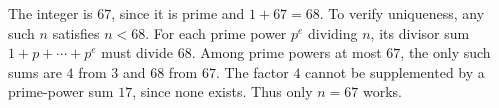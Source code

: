 The integer is $\boxed{67}$, since it is prime and $1+67=68$. To verify uniqueness, any such $n$ satisfies $n<68$. For each prime power $p^e$ dividing $n$, its divisor sum $1+p+\cdots+p^e$ must divide $68$. Among prime powers at most $67$, the only such sums are $4$ from $3$ and $68$ from $67$. The factor $4$ cannot be supplemented by a prime-power sum $17$, since none exists. Thus only $n=67$ works.
